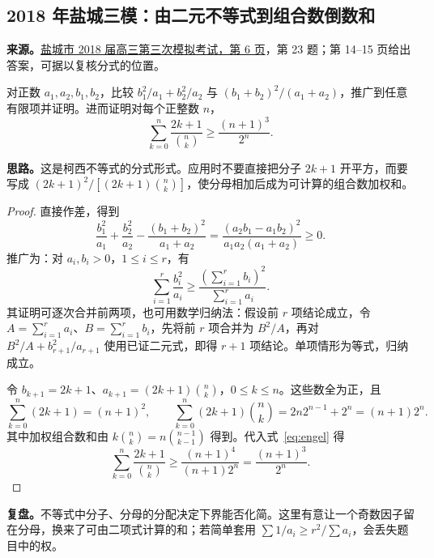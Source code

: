 \documentclass[UTF8,12pt,a4paper,fontset=fandol]{ctexart}
\begin{document}
\subsection{2018 年盐城三模：由二元不等式到组合数倒数和}\label{sec:c2018yc3}
\textbf{来源。}\href{https://www.mianfeiwendang.com/doc/0bbc44eefbbd378979599972083302e88da33d09/6}{盐城市 2018 届高三第三次模拟考试，第 6 页}，第 23 题；第 14--15 页给出答案，可据以复核分式的位置。
\begin{example}[题意]
对正数 $a_1,a_2,b_1,b_2$，比较 $b_1^2/a_1+b_2^2/a_2$ 与 $(b_1+b_2)^2/(a_1+a_2)$，推广到任意有限项并证明。进而证明对每个正整数 $n$，
\[
\sum_{k=0}^{n}\frac{2k+1}{\binom nk}\geq\frac{(n+1)^3}{2^n}.
\]
\end{example}
\textbf{思路。}这是柯西不等式的分式形式。应用时不要直接把分子 $2k+1$ 开平方，而要写成 $(2k+1)^2/[(2k+1)\binom nk]$，使分母相加后成为可计算的组合数加权和。
\begin{proof}
直接作差，得到
\[
\frac{b_1^2}{a_1}+\frac{b_2^2}{a_2}
-\frac{(b_1+b_2)^2}{a_1+a_2}
=\frac{(a_2b_1-a_1b_2)^2}{a_1a_2(a_1+a_2)}\geq0.
\]
推广为：对 $a_i,b_i>0$，$1\leq i\leq r$，有
\begin{equation}\label{eq:engel}
\sum_{i=1}^{r}\frac{b_i^2}{a_i}\geq
\frac{(\sum_{i=1}^{r}b_i)^2}{\sum_{i=1}^{r}a_i}.
\end{equation}
其证明可逐次合并前两项，也可用数学归纳法：假设前 $r$ 项结论成立，令 $A=\sum_{i=1}^{r}a_i$、$B=\sum_{i=1}^{r}b_i$，先将前 $r$ 项合并为 $B^2/A$，再对 $B^2/A+b_{r+1}^2/a_{r+1}$ 使用已证二元式，即得 $r+1$ 项结论。单项情形为等式，归纳成立。

令 $b_{k+1}=2k+1$、$a_{k+1}=(2k+1)\binom nk$，$0\leq k\leq n$。这些数全为正，且
\[
\sum_{k=0}^{n}(2k+1)=(n+1)^2,
\qquad
\sum_{k=0}^{n}(2k+1)\binom nk
=2n2^{n-1}+2^n=(n+1)2^n.
\]
其中加权组合数和由 $k\binom nk=n\binom{n-1}{k-1}$ 得到。代入式~\eqref{eq:engel} 得
\[
\sum_{k=0}^{n}\frac{2k+1}{\binom nk}
\geq\frac{(n+1)^4}{(n+1)2^n}
=\frac{(n+1)^3}{2^n}.
\]
\end{proof}
\textbf{复盘。}不等式中分子、分母的分配决定下界能否化简。这里有意让一个奇数因子留在分母，换来了可由二项式计算的和；若简单套用 $\sum1/a_i\geq r^2/\sum a_i$，会丢失题目中的权。
\end{document}
